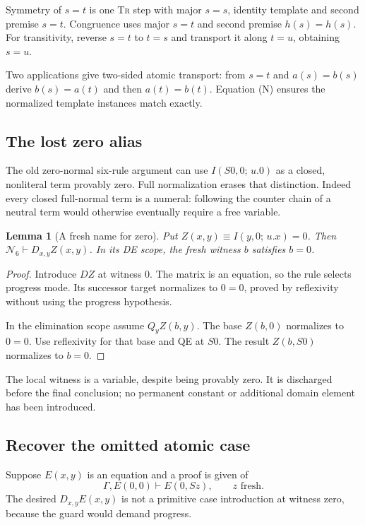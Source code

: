 \documentclass[11pt]{article}
\newtheorem{lemma}[theorem]{Lemma}
\theoremstyle{definition}
\newcommand{\Six}{\ensuremath{\mathcal N_6}}
\newcommand{\I}[3]{I(#1,#2;\,#3)}
\newcommand{\rulename}[1]{\textup{\textsc{#1}}}
\begin{document}
Symmetry of $s=t$ is one \rulename{Tr} step with major $s=s$, identity
template and second premise $s=t$. Congruence uses major $s=t$ and
second premise $h(s)=h(s)$. For transitivity, reverse $s=t$ to $t=s$
and transport it along $t=u$, obtaining $s=u$.

Two applications give two-sided atomic transport:
from $s=t$ and $a(s)=b(s)$ derive $b(s)=a(t)$ and then
$a(t)=b(t)$. Equation (N) ensures the normalized template instances
match exactly.

\subsection{The lost zero alias}

The old zero-normal six-rule argument can use
$\I{S0}{0}{u.0}$ as a closed, nonliteral term provably zero.
Full normalization erases that distinction. Indeed every closed
full-normal term is a numeral: following the counter chain of a
neutral term would otherwise eventually require a free variable.

\begin{lemma}[A fresh name for zero]
\label{lem:namedzero}
Put $Z(x,y)\equiv\I{y}{0}{u.x}=0$. Then
$\Six\vdash D_{x,y}Z(x,y)$. In its \rulename{DE} scope,
the fresh witness $b$ satisfies $b=0$.
\end{lemma}

\begin{proof}
Introduce $D Z$ at witness $0$. The matrix is an equation, so the rule
selects progress mode. Its successor target normalizes to $0=0$,
proved by reflexivity without using the progress hypothesis.

In the elimination scope assume $Q_yZ(b,y)$. The base $Z(b,0)$
normalizes to $0=0$. Use reflexivity for that base and \rulename{QE}
at $S0$. The result $Z(b,S0)$ normalizes to $b=0$.
\end{proof}

The local witness is a variable, despite being provably zero. It is
discharged before the final conclusion; no permanent constant or
additional domain element has been introduced.

\subsection{Recover the omitted atomic case}

Suppose $E(x,y)$ is an equation and a proof is given of
\[
 \Gamma,E(0,0)\vdash E(0,Sz),\qquad z\text{ fresh}.
 \tag{C0}
\]
The desired $D_{x,y}E(x,y)$ is not a primitive case introduction at
witness zero, because the guard would demand progress.
\end{document}
